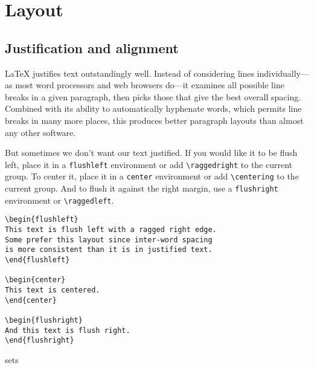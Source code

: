 \chapter{Layout}

\section{Justification and alignment}

\LaTeX{} justifies text outstandingly well.
Instead of considering lines individually---as most word processors and
web browsers do---it examines all possible line breaks in a given paragraph,
then picks those that give the best overall
spacing.\punckern{}
Combined with its ability to automatically hyphenate words,
which permits line breaks in many more places,\punckern{}
this produces better paragraph layouts than almost any other software.

But sometimes we don't want our text justified.
If you would like it to be flush left,
place it in a \texttt{flushleft} environment
or add \verb|\raggedright| to the current group.
To center it, place it in a
\texttt{center} environment or add \verb|\centering| to the current group.
And to flush it against the right margin,
use a \texttt{flushright} environment or \verb|\raggedleft|.

\begin{leftfigure}
\begin{lstlisting}
\begin{flushleft}
This text is flush left with a ragged right edge.
Some prefer this layout since inter-word spacing
is more consistent than it is in justified text.
\end{flushleft}

\begin{center}
This text is centered.
\end{center}

\begin{flushright}
And this text is flush right.
\end{flushright}
\end{lstlisting}
\end{leftfigure}
sets
\begin{leftfigure}
\end{leftfigure}

